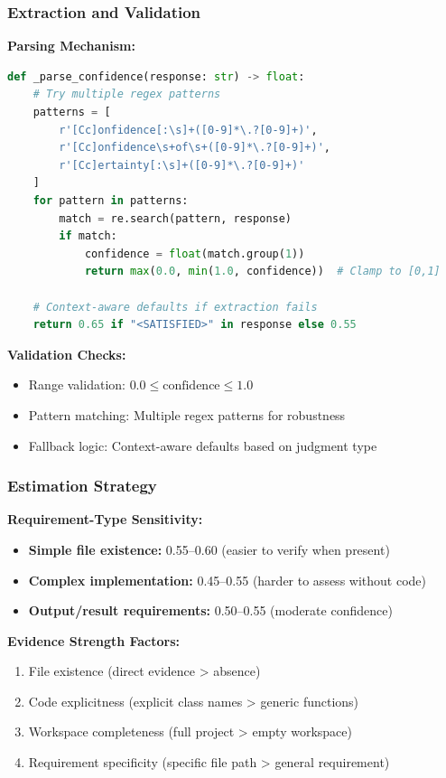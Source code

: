 \documentclass[11pt,a4paper]{article}
\begin{document}
\subsubsection{Extraction and Validation}

\textbf{Parsing Mechanism:}
\begin{lstlisting}[language=Python, caption={Confidence Extraction Algorithm}]
def _parse_confidence(response: str) -> float:
    # Try multiple regex patterns
    patterns = [
        r'[Cc]onfidence[:\s]+([0-9]*\.?[0-9]+)',
        r'[Cc]onfidence\s+of\s+([0-9]*\.?[0-9]+)',
        r'[Cc]ertainty[:\s]+([0-9]*\.?[0-9]+)'
    ]
    for pattern in patterns:
        match = re.search(pattern, response)
        if match:
            confidence = float(match.group(1))
            return max(0.0, min(1.0, confidence))  # Clamp to [0,1]
    
    # Context-aware defaults if extraction fails
    return 0.65 if "<SATISFIED>" in response else 0.55
\end{lstlisting}

\textbf{Validation Checks:}
\begin{itemize}[leftmargin=*]
    \item Range validation: $0.0 \leq \text{confidence} \leq 1.0$
    \item Pattern matching: Multiple regex patterns for robustness
    \item Fallback logic: Context-aware defaults based on judgment type
\end{itemize}

\subsubsection{Estimation Strategy}

\textbf{Requirement-Type Sensitivity:}
\begin{itemize}[leftmargin=*]
    \item \textbf{Simple file existence:} 0.55--0.60 (easier to verify when present)
    \item \textbf{Complex implementation:} 0.45--0.55 (harder to assess without code)
    \item \textbf{Output/result requirements:} 0.50--0.55 (moderate confidence)
\end{itemize}

\textbf{Evidence Strength Factors:}
\begin{enumerate}[leftmargin=*]
    \item File existence (direct evidence > absence)
    \item Code explicitness (explicit class names > generic functions)
    \item Workspace completeness (full project > empty workspace)
    \item Requirement specificity (specific file path > general requirement)
\end{enumerate}
\end{document}
